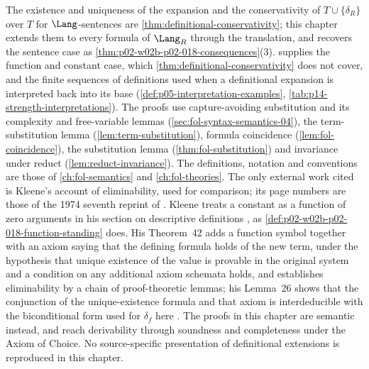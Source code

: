 The existence and uniqueness of the expansion and the conservativity of
\(T\cup\{\delta_R\}\) over \(T\) for \(\Lang\)-sentences are
\cref{thm:definitional-conservativity}; this chapter extends them to
every formula of \(\Lang_R\) through the translation, and recovers the
sentence case as \cref{thm:p02-w02b-p02-018-consequences}(3).
 supplies the function and
constant case, which \cref{thm:definitional-conservativity} does not
cover, and the finite sequences of definitions used when a definitional
expansion is interpreted back into its base
(\cref{def:p05-interpretation-examples},
\cref{tab:p14-strength-interpretations}).  The proofs
use capture-avoiding substitution and its complexity and free-variable
lemmas (\cref{sec:fol-syntax-semantics-04}), the term-substitution lemma
(\cref{lem:term-substitution}), formula coincidence
(\cref{lem:fol-coincidence}), the substitution lemma
(\cref{thm:fol-substitution}) and invariance under reduct
(\cref{lem:reduct-invariance}).  The definitions, notation and conventions
are those of \cref{ch:fol-semantics} and \cref{ch:fol-theories}.  The
only external work cited is Kleene's account of eliminability, used for
comparison; its page numbers are those of the 1974 seventh reprint of
\cite{Kleene1952}.  Kleene treats a constant as a function of zero
arguments in his section on descriptive definitions
\cite[\S\,74, p.~407]{Kleene1952}, as
\cref{def:p02-w02b-p02-018-function-standing} does.  His Theorem~42 adds
a function symbol together with an axiom saying that the defining formula
holds of the new term, under the hypothesis that unique existence of the
value is provable in the original system and a condition on any
additional axiom schemata holds, and establishes eliminability by a chain
of proof-theoretic lemmas; his Lemma~26 shows that the conjunction of the
unique-existence formula and that axiom is interdeducible with the
biconditional form used for \(\delta_f\) here \cite[\S\,74, Theorem~42 and Lemma~26,
pp.~408--409]{Kleene1952}.  The proofs in this chapter are semantic
instead, and reach derivability through soundness and completeness under
the Axiom of Choice.  No source-specific presentation of definitional
extensions is reproduced in this chapter.
